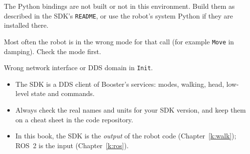 \begin{troublebox}
\begin{description}[leftmargin=0.6cm,nosep]
  \item[\texttt{ModuleNotFoundError}] The Python bindings are not built or not in this environment. Build them as described in the SDK's \texttt{README}, or use the robot's system Python if they are installed there\guess.
  \item[A call returns an error code] Most often the robot is in the wrong mode for that call (for example \verb!Move! in damping). Check the mode first.
  \item[The callback never runs] Wrong network interface or DDS domain in \verb!Init!.
\end{description}
\end{troublebox}

\begin{keyidea}
\begin{itemize}[nosep]
  \item The SDK is a DDS client of Booster's services: modes, walking, head, low-level state and commands.
  \item Always check the real names and units for your SDK version, and keep them on a cheat sheet in the code repository.
  \item In this book, the SDK is the \emph{output} of the robot code (Chapter~\ref{k:walk}); ROS~2 is the input (Chapter~\ref{k:ros}).
\end{itemize}
\end{keyidea}
